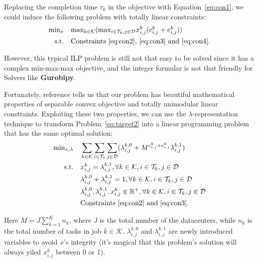 \documentclass{llncs}
\begin{document}
Replacing the completion time $\tau_k$ in the objective with Equation~\ref{eq:con1}, we could induce the following problem with totally linear constraints:
\begin{equation}
    \begin{aligned}
    \mbox{min}_x \quad &\mbox{max}_{k \in \mathcal{K}}(\mbox{max}_{i \in \mathcal{T}_k, j \in \mathcal{D}} x_{i,j}^k(c_{i,j}^k+e_{i,j}^k)) \\
\mbox{s.t.} \quad &\mbox{Constraints~\ref{eq:con2},~\ref{eq:con3} and~\ref{eq:con4}.} 
    \end{aligned}
    \label{eq:target2}
\end{equation}

However, this typical ILP problem is still not that easy to be solved since it has a complex min-max-max objective, and the integer formular is not that friendly for Solvers like {\bf Gurobipy}.

Fortunately, reference \cite{ref_11} tells us that our problem has beautiful mathematical properties of separable convex objective and totally unimodular linear constraints. Exploiting these two properties, we can use the $\lambda$-representation \cite{ref_11} technique to transform Problem~\ref{eq:target2} into a linear programming problem that has the same optimal solution:
\begin{equation}
    \begin{aligned}
    \mbox{min}_{x,\lambda} \quad &\sum_{k \in \mathcal{K}} \sum_{i \in \mathcal{T}_k}\sum_{j \in \mathcal{D}}(\lambda_{i,j}^{k,0}+M^{c_{i,j}^k+e_{i,j}^k}\lambda_{i,j}^{k,1}) \\
\mbox{s.t.} \quad &x_{i,j}^k=\lambda_{i,j}^{k,1}, \forall k \in \mathcal{K}, i \in \mathcal{T}_k, j \in \mathcal{D} \\
&\lambda_{i,j}^{k,0}+\lambda_{i,j}^{k,1}=1, \forall k \in \mathcal{K}, i \in \mathcal{T}_k, j \in \mathcal{D} \\
&\lambda_{i,j}^{k,0},\lambda_{i,j}^{k,1},x_{i,j}^k \in \mathbb{R^+}, \forall k \in \mathcal{K}, i \in \mathcal{T}_k, j \in \mathcal{D} \\
&\mbox{Constraints~\ref{eq:con2} and~\ref{eq:con3}.} 
    \end{aligned}
    \label{eq:target3}
\end{equation}

Here $M = J\sum_{k=1}^K n_k$, where $J$ is the total number of the datacenters, while $n_k$ is the total number of tasks in job $k \in \mathcal{K}$. $\lambda_{i,j}^{k,0}$ and $\lambda_{i,j}^{k,1}$ are newly introduced variables to avoid $x$'s integrity (it's magical that this problem's solution will always yiled $x_{i,j}^k$ between 0 or 1).
\end{document}
